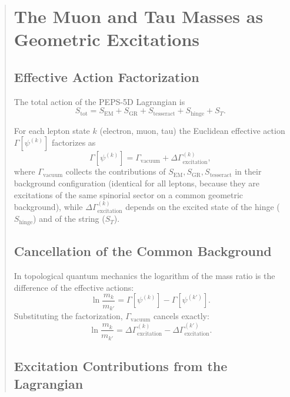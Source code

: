 \documentclass[12pt]{article}
\begin{document}
\begin{abstract}
\section{The Muon and Tau Masses as Geometric Excitations}

\subsection{Effective Action Factorization}

The total action of the PEPS-5D Lagrangian is
\[
S_{\text{tot}} = S_{\text{EM}} + S_{\text{GR}} + S_{\text{tesseract}} + S_{\text{hinge}} + S_T .
\]

For each lepton state \(k\) (electron, muon, tau) the Euclidean effective action \(\Gamma[\psi^{(k)}]\) factorizes as
\[
\Gamma[\psi^{(k)}] = \Gamma_{\text{vacuum}} + \Delta\Gamma_{\text{excitation}}^{(k)} ,
\]
where \(\Gamma_{\text{vacuum}}\) collects the contributions of \(S_{\text{EM}}, S_{\text{GR}}, S_{\text{tesseract}}\) in their background configuration (identical for all leptons, because they are excitations of the same spinorial sector on a common geometric background), while \(\Delta\Gamma_{\text{excitation}}^{(k)}\) depends on the excited state of the hinge (\(S_{\text{hinge}}\)) and of the string (\(S_T\)).

\subsection{Cancellation of the Common Background}

In topological quantum mechanics the logarithm of the mass ratio is the difference of the effective actions:
\[
\ln\frac{m_k}{m_{k'}} = \Gamma[\psi^{(k)}] - \Gamma[\psi^{(k')}] .
\]
Substituting the factorization, \(\Gamma_{\text{vacuum}}\) cancels exactly:
\[
\ln\frac{m_k}{m_{k'}} = \Delta\Gamma_{\text{excitation}}^{(k)} - \Delta\Gamma_{\text{excitation}}^{(k')} .
\]

\subsection{Excitation Contributions from the Lagrangian}


\end{abstract}
\end{document}
